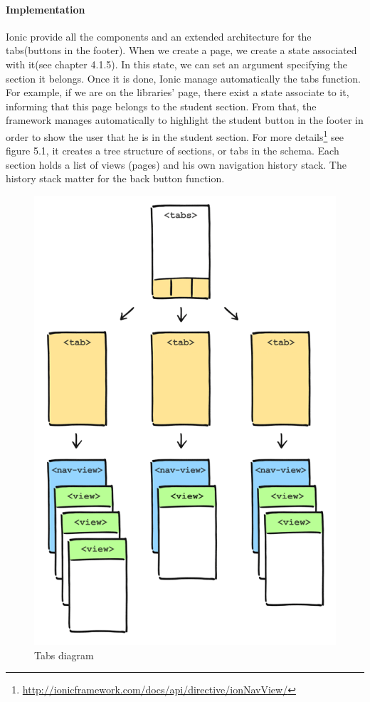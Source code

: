\documentclass{eplmastersthesis}
\begin{document}
\paragraph{Implementation}
Ionic provide all the components and an extended architecture for the tabs(buttons in the footer). When we create a page, we create a state associated with it(see chapter 4.1.5). In this state, we can set an argument specifying the section it belongs. Once it is done, Ionic manage automatically the tabs function. 
For example, if we are on the libraries’ page, there exist a state associate to it, informing that this page belongs to the student section. From that, the framework manages automatically to highlight the student button in the footer in order to show the user that he is in the student section.
For more details\footnote{\url{http://ionicframework.com/docs/api/directive/ionNavView/}} see figure 5.1, it creates a tree structure of sections, or tabs in the schema. Each section holds a list of views (pages) and his own navigation history stack. The history stack matter for the back button function. 
\begin{figure}
\centering
\includegraphics[scale = 0.3]{Images/tabs-nav-stack.png}
\caption{Tabs diagram}
\end{figure}
\end{document}
